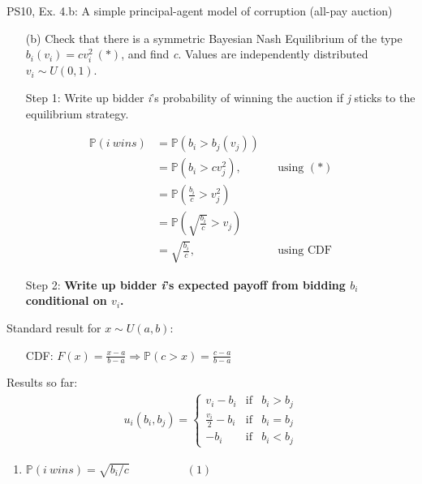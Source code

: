 \begin{frame}{PS10, Ex. 4.b: A simple principal-agent model of corruption (all-pay auction)}
    \begin{itemize}
      \item[(b)] Check that there is a symmetric Bayesian Nash Equilibrium of the type $b_i(v_i) = cv_i^2\ (*)$, and find \textit{c}. Values are independently distributed $v_i\sim U(0, 1)$.
    \end{itemize} \vspace{-8pt}
    \begin{multicols}{2}
      \begin{itemize}
        \item[Step 1:] Write up bidder \textit{i}'s probability of winning the auction if \textit{j} sticks to the equilibrium strategy.
      \end{itemize} \vspace{-8pt}
      \begin{align*}
        \mathbb{P}(i\ wins)&=\mathbb{P}(b_i>b_j(v_j))\\
                           &=\mathbb{P}(b_i>cv_j^2),&&\text{using }(*)\\
                           &=\mathbb{P}\left(\frac{b_i}{c}>v_j^2\right)\\
                           &=\mathbb{P}\left(\sqrt{\frac{b_i}{c}}>v_j\right)\\
                           &=\sqrt{\frac{b_i}{c}},&&\text{using CDF}
      \end{align*} \vspace{-8pt}
      \begin{itemize}
        \item[Step 2:] \textbf{Write up bidder \textit{i}'s expected payoff from bidding $b_i$ conditional on $v_i$.}
      \end{itemize}
      \vfill\null\columnbreak
      Standard result for $x\sim U(a, b):$ \vspace{-6pt}
      \begin{itemize}
        \item[CDF:] $F(x)=\frac{x-a}{b-a}\Rightarrow\mathbb{P}(c>x)=\frac{c-a}{b-a}$
      \end{itemize}
      \vspace{-6pt}
      Results so far: \vspace{-6pt}
      \begin{align*}
        u_i(b_i,b_j)=\left\{\begin{array}{lcl}
          v_i-b_i           & \text{if} & b_i>b_j \\
          \frac{v_i}{2}-b_i & \text{if} & b_i=b_j \\
          -b_i              & \text{if} & b_i<b_j
        \end{array}\right.
      \end{align*} \vspace{-16pt}
      \begin{enumerate}
        \item $\mathbb{P}(i\ wins)=\sqrt{b_i/c}\quad\quad\quad\quad\quad(1)$
      \end{enumerate}
      \vfill\null
    \end{multicols}
\end{frame}
